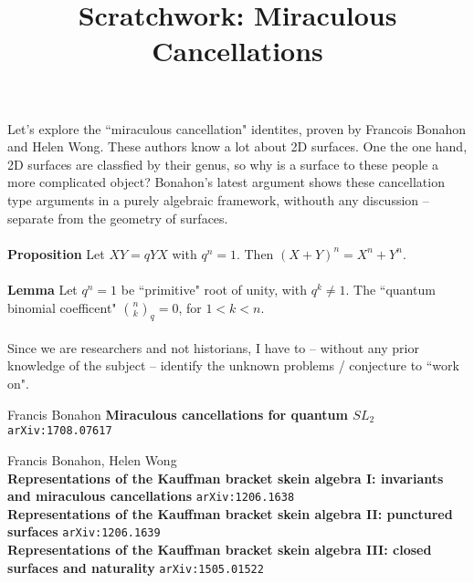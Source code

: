 \documentclass[12pt]{article}
\title{Scratchwork: Miraculous Cancellations}
\date{}
\begin{document}

\sffamily

\maketitle

\noindent Let's explore the ``miraculous cancellation" identites, proven by Francois Bonahon and Helen Wong.  These authors know a lot about 2D surfaces.  One the one hand, 2D surfaces are classfied by their genus, so why is a surface to these people a more complicated object?  Bonahon's latest argument shows these cancellation type arguments in a purely algebraic framework, withouth any discussion -- separate from the geometry of surfaces. \\ \\
\textbf{Proposition} Let $XY = q YX$ with $q^n = 1$.  Then $(X+Y)^n = X^n + Y^n$. \\ \\
\textbf{Lemma} Let $q^n = 1$ be ``primitive" root of unity, with $q^k \neq 1$.  The ``quantum binomial coefficent" $\binom{n}{k}_q =0$, for $1 < k < n$. \\ \\
Since we are researchers and not historians, I have to -- without any prior knowledge of the subject -- identify the unknown problems / conjecture to ``work on". 

\vfill

\begin{thebibliography}{}

\item Francis Bonahon \textbf{Miraculous cancellations for quantum $SL_2$} \texttt{arXiv:1708.07617}

\item Francis Bonahon, Helen Wong \\ 
\textbf{Representations of the Kauffman bracket skein algebra I: invariants and miraculous cancellations} \texttt{arXiv:1206.1638} \\
\textbf{Representations of the Kauffman bracket skein algebra II: punctured surfaces
} \texttt{arXiv:1206.1639} \\
\textbf{Representations of the Kauffman bracket skein algebra III: closed surfaces and naturality} \texttt{arXiv:1505.01522} 

\end{thebibliography}
\end{document}
